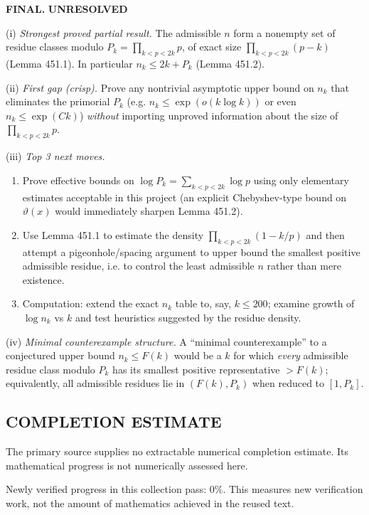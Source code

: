 \textbf{FINAL.} \textbf{UNRESOLVED}

(i) \emph{Strongest proved partial result.} The admissible $n$ form a nonempty set of residue classes modulo $P_k=\prod_{k<p<2k}p$, of exact size $\prod_{k<p<2k}(p-k)$ (Lemma 451.1). In particular $n_k\le 2k+P_k$ (Lemma 451.2).

(ii) \emph{First gap (crisp).} Prove any nontrivial asymptotic upper bound on $n_k$ that eliminates the primorial $P_k$ (e.g. $n_k\le \exp(o(k\log k))$ or even $n_k\le \exp(Ck)$) \emph{without} importing unproved information about the size of $\prod_{k<p<2k}p$.

(iii) \emph{Top 3 next moves.}
\begin{enumerate}
\item Prove effective bounds on $\log P_k=\sum_{k<p<2k}\log p$ using only elementary estimates acceptable in this project (an explicit Chebyshev-type bound on $\vartheta(x)$ would immediately sharpen Lemma 451.2).
\item Use Lemma 451.1 to estimate the density $\prod_{k<p<2k}(1-k/p)$ and then attempt a pigeonhole/spacing argument to upper bound the smallest positive admissible residue, i.e. to control the least admissible $n$ rather than mere existence.
\item Computation: extend the exact $n_k$ table to, say, $k\le 200$; examine growth of $\log n_k$ vs $k$ and test heuristics suggested by the residue density.
\end{enumerate}

(iv) \emph{Minimal counterexample structure.} A ``minimal counterexample'' to a conjectured upper bound $n_k\le F(k)$ would be a $k$ for which \emph{every} admissible residue class modulo $P_k$ has its smallest positive representative $>F(k)$; equivalently, all admissible residues lie in $(F(k),P_k)$ when reduced to $[1,P_k]$.




\subsection*{COMPLETION ESTIMATE}
The primary source supplies no extractable numerical completion estimate. Its mathematical progress is not numerically assessed here.

Newly verified progress in this collection pass: $0\%$. This measures new verification work, not the amount of mathematics achieved in the reused text.
